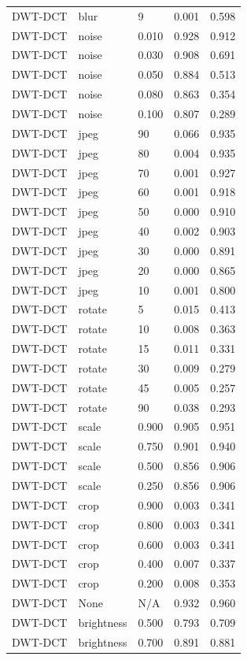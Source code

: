 \begin{table}
\begin{tabular}{lllrr}
DWT-DCT & blur & 9 & 0.001 & 0.598 \\
DWT-DCT & noise & 0.010 & 0.928 & 0.912 \\
DWT-DCT & noise & 0.030 & 0.908 & 0.691 \\
DWT-DCT & noise & 0.050 & 0.884 & 0.513 \\
DWT-DCT & noise & 0.080 & 0.863 & 0.354 \\
DWT-DCT & noise & 0.100 & 0.807 & 0.289 \\
DWT-DCT & jpeg & 90 & 0.066 & 0.935 \\
DWT-DCT & jpeg & 80 & 0.004 & 0.935 \\
DWT-DCT & jpeg & 70 & 0.001 & 0.927 \\
DWT-DCT & jpeg & 60 & 0.001 & 0.918 \\
DWT-DCT & jpeg & 50 & 0.000 & 0.910 \\
DWT-DCT & jpeg & 40 & 0.002 & 0.903 \\
DWT-DCT & jpeg & 30 & 0.000 & 0.891 \\
DWT-DCT & jpeg & 20 & 0.000 & 0.865 \\
DWT-DCT & jpeg & 10 & 0.001 & 0.800 \\
DWT-DCT & rotate & 5 & 0.015 & 0.413 \\
DWT-DCT & rotate & 10 & 0.008 & 0.363 \\
DWT-DCT & rotate & 15 & 0.011 & 0.331 \\
DWT-DCT & rotate & 30 & 0.009 & 0.279 \\
DWT-DCT & rotate & 45 & 0.005 & 0.257 \\
DWT-DCT & rotate & 90 & 0.038 & 0.293 \\
DWT-DCT & scale & 0.900 & 0.905 & 0.951 \\
DWT-DCT & scale & 0.750 & 0.901 & 0.940 \\
DWT-DCT & scale & 0.500 & 0.856 & 0.906 \\
DWT-DCT & scale & 0.250 & 0.856 & 0.906 \\
DWT-DCT & crop & 0.900 & 0.003 & 0.341 \\
DWT-DCT & crop & 0.800 & 0.003 & 0.341 \\
DWT-DCT & crop & 0.600 & 0.003 & 0.341 \\
DWT-DCT & crop & 0.400 & 0.007 & 0.337 \\
DWT-DCT & crop & 0.200 & 0.008 & 0.353 \\
DWT-DCT & None & N/A & 0.932 & 0.960 \\
DWT-DCT & brightness & 0.500 & 0.793 & 0.709 \\
DWT-DCT & brightness & 0.700 & 0.891 & 0.881 \\

\end{tabular}
\end{table}
